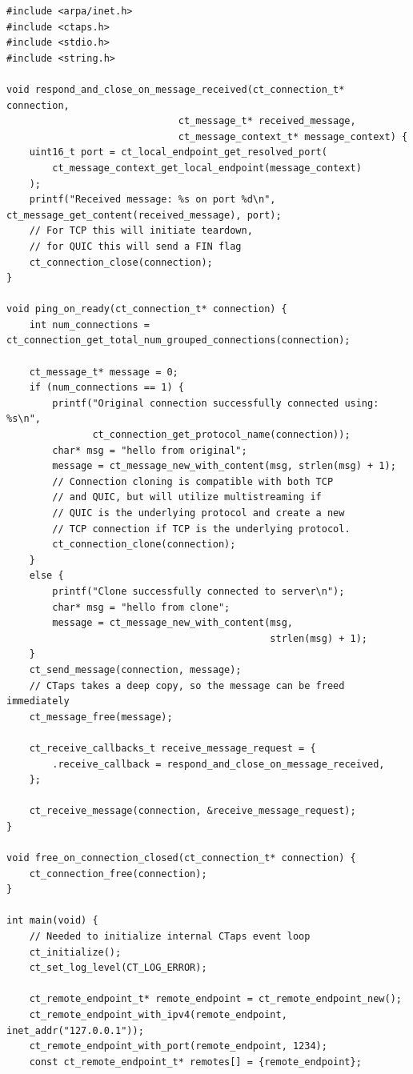 \newpage
{%
  \captionsetup{type=listing}%
    \begin{verbatim}
#include <arpa/inet.h>
#include <ctaps.h>
#include <stdio.h>
#include <string.h>

void respond_and_close_on_message_received(ct_connection_t* connection, 
                              ct_message_t* received_message,
                              ct_message_context_t* message_context) {
    uint16_t port = ct_local_endpoint_get_resolved_port(
        ct_message_context_get_local_endpoint(message_context)
    );
    printf("Received message: %s on port %d\n", ct_message_get_content(received_message), port);
    // For TCP this will initiate teardown,
    // for QUIC this will send a FIN flag
    ct_connection_close(connection);
}

void ping_on_ready(ct_connection_t* connection) {
    int num_connections = ct_connection_get_total_num_grouped_connections(connection);

    ct_message_t* message = 0;
    if (num_connections == 1) {
        printf("Original connection successfully connected using: %s\n",
               ct_connection_get_protocol_name(connection));
        char* msg = "hello from original";
        message = ct_message_new_with_content(msg, strlen(msg) + 1);
        // Connection cloning is compatible with both TCP
        // and QUIC, but will utilize multistreaming if
        // QUIC is the underlying protocol and create a new
        // TCP connection if TCP is the underlying protocol.
        ct_connection_clone(connection);
    }
    else {
        printf("Clone successfully connected to server\n");
        char* msg = "hello from clone";
        message = ct_message_new_with_content(msg,
                                              strlen(msg) + 1);
    }
    ct_send_message(connection, message);
    // CTaps takes a deep copy, so the message can be freed immediately
    ct_message_free(message);

    ct_receive_callbacks_t receive_message_request = {
        .receive_callback = respond_and_close_on_message_received,
    };

    ct_receive_message(connection, &receive_message_request);
}

void free_on_connection_closed(ct_connection_t* connection) {
    ct_connection_free(connection);
}

int main(void) {
    // Needed to initialize internal CTaps event loop
    ct_initialize();
    ct_set_log_level(CT_LOG_ERROR);

    ct_remote_endpoint_t* remote_endpoint = ct_remote_endpoint_new();
    ct_remote_endpoint_with_ipv4(remote_endpoint, inet_addr("127.0.0.1"));
    ct_remote_endpoint_with_port(remote_endpoint, 1234);
    const ct_remote_endpoint_t* remotes[] = {remote_endpoint};


\end{verbatim}}
